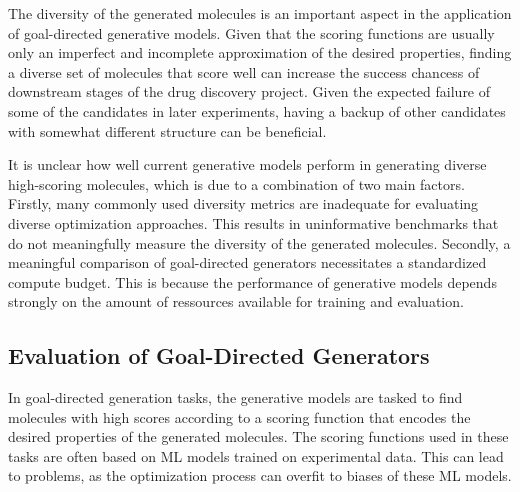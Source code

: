 


The diversity of the generated molecules is an important aspect in the
application of goal-directed generative models. Given that the scoring functions
are usually only an imperfect and incomplete approximation of the desired
properties, finding a diverse set of molecules that score well can increase the
success chancess of downstream stages of the drug discovery project. Given the
expected failure of some of the candidates in later experiments, having a backup
of other candidates with somewhat different structure can be beneficial.

It is unclear how well current generative models perform in generating diverse
high-scoring molecules, which is due to a combination of two main factors. 
Firstly, many commonly used diversity metrics are inadequate for evaluating
diverse optimization approaches. This results in uninformative benchmarks that
do not meaningfully measure the diversity of the generated molecules. Secondly,
a meaningful comparison of goal-directed generators necessitates a standardized
compute budget. This is because the performance of generative models depends strongly 
on the amount of ressources available for training and evaluation.

\subsection{Evaluation of Goal-Directed Generators}
In goal-directed generation tasks, the generative models are tasked to find
molecules with high scores according to a scoring function that encodes the
desired properties of the generated molecules. The scoring functions used in
these tasks are often based on ML models trained on experimental
data. This can lead to problems, as the optimization process can overfit to
biases of these ML models. 

